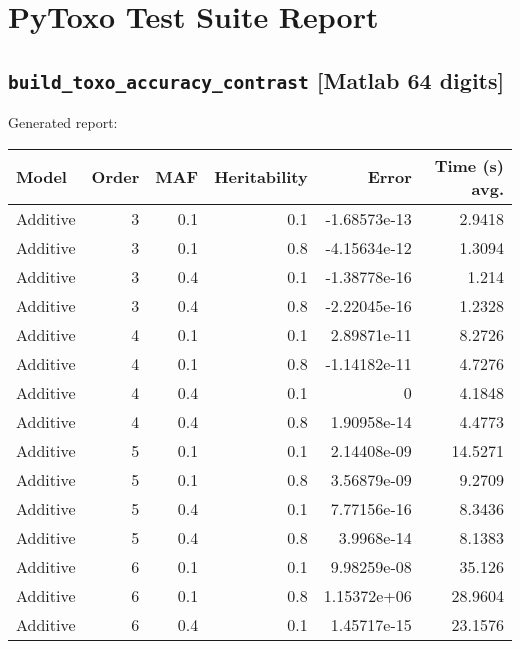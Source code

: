 \documentclass{article}
\begin{document}
\section*{PyToxo Test Suite Report}
\subsection*{\texttt{build\_toxo\_accuracy\_contrast} [Matlab 64 digits]}
Generated report:

\begin{longtable}[H]{lrrrrr}
\hline
 Model          &   Order &   MAF &   Heritability &            Error &   Time (s) avg. \\
\hline
 Additive       &       3 &   0.1 &            0.1 &     -1.68573e-13 &          2.9418 \\
 Additive       &       3 &   0.1 &            0.8 &     -4.15634e-12 &          1.3094 \\
 Additive       &       3 &   0.4 &            0.1 &     -1.38778e-16 &          1.214  \\
 Additive       &       3 &   0.4 &            0.8 &     -2.22045e-16 &          1.2328 \\
 Additive       &       4 &   0.1 &            0.1 &      2.89871e-11 &          8.2726 \\
 Additive       &       4 &   0.1 &            0.8 &     -1.14182e-11 &          4.7276 \\
 Additive       &       4 &   0.4 &            0.1 &      0           &          4.1848 \\
 Additive       &       4 &   0.4 &            0.8 &      1.90958e-14 &          4.4773 \\
 Additive       &       5 &   0.1 &            0.1 &      2.14408e-09 &         14.5271 \\
 Additive       &       5 &   0.1 &            0.8 &      3.56879e-09 &          9.2709 \\
 Additive       &       5 &   0.4 &            0.1 &      7.77156e-16 &          8.3436 \\
 Additive       &       5 &   0.4 &            0.8 &      3.9968e-14  &          8.1383 \\
 Additive       &       6 &   0.1 &            0.1 &      9.98259e-08 &         35.126  \\
 Additive       &       6 &   0.1 &            0.8 &      1.15372e+06 &         28.9604 \\
 Additive       &       6 &   0.4 &            0.1 &      1.45717e-15 &         23.1576 \\

\end{longtable}
\end{document}
